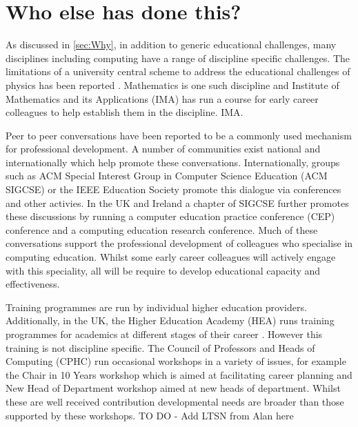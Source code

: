 \documentclass[sigconf]{acmart}
\begin{document}
\section{Who else has done this?}
As discussed in \ref{sec:Why}, in addition to generic educational challenges, many disciplines including computing have a range of discipline specific challenges. The limitations of a university central scheme to address the educational challenges of physics has been reported \cite{Magueijo2009}.  Mathematics is one such discipline and Institute of Mathematics and its Applications (IMA) has run a course for early career colleagues to help establish them in the discipline. {IMA}.  

Peer to peer conversations have been reported to be a commonly used mechanism for professional development\cite{King2004}. A number of communities exist national and internationally which help promote these conversations. Internationally, groups such as ACM Special Interest Group in Computer Science Education (ACM SIGCSE) or the IEEE Education Society promote this dialogue via conferences and other activies.  In the UK and Ireland a chapter of SIGCSE further promotes these discussions by running a computer education practice conference (CEP) conference and a computing education research conference. Much of these conversations support the professional development of colleagues who specialise in computing education. Whilst some early career colleagues will actively engage with this speciality, all will be require to develop educational capacity and effectiveness.
 
Training programmes are run by individual higher education providers. Additionally, in the UK, the Higher Education Academy (HEA) runs training programmes for academics at different stages of their career \cite{HEATraining}. However this training is not discipline specific. The Council of Professors and Heads of Computing (CPHC) run occasional workshops in a variety of issues, for example the Chair in 10 Years workshop which is aimed at facilitating career planning and New Head of Department workshop aimed at new heads of department. Whilst these are well received contribution developmental needs are broader than those supported by these workshops. TO DO - Add LTSN from Alan here
\end{document}
